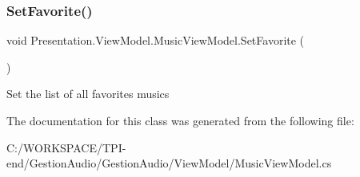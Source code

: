 \subsubsection{\texorpdfstring{Set\+Favorite()}{SetFavorite()}}
{\footnotesize\ttfamily void Presentation.\+View\+Model.\+Music\+View\+Model.\+Set\+Favorite (\begin{DoxyParamCaption}{ }\end{DoxyParamCaption})}



Set the list of all favorites musics 



The documentation for this class was generated from the following file\+:\begin{DoxyCompactItemize}
\item 
C\+:/\+W\+O\+R\+K\+S\+P\+A\+C\+E/\+T\+P\+I-\/end/\+Gestion\+Audio/\+Gestion\+Audio/\+View\+Model/Music\+View\+Model.\+cs\end{DoxyCompactItemize}
